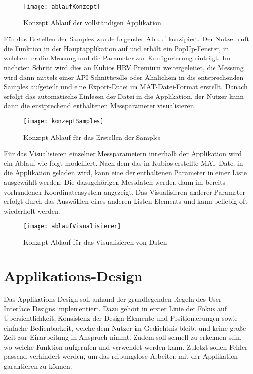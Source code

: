 \begin{figure}[H]
	\centering
	\texttt{[image: ablaufKonzept]}
	\caption{Konzept Ablauf der vollständigen Applikation}
	\label{fig:ablaufKonzept}
\end{figure}

Für das Erstellen der Samples wurde folgender Ablauf konzipiert. Der Nutzer ruft die Funktion in der Hauptapplikation auf und erhält ein PopUp-Fenster, in welchem er die Messung und die Parameter zur Konfigurierung einträgt. Im nächsten Schritt wird dies an Kubios HRV Premium weitergeleitet, die Messung  wird dann mittels einer API Schnittstelle oder Ähnlichem in die entsprechenden Samples aufgeteilt und eine Export-Datei im MAT-Datei-Format erstellt. Danach erfolgt das automatische Einlesen der Datei in die Applikation, der Nutzer kann dann die enstprechend enthaltenen Messparameter visualisieren.

\begin{figure}[H]
	\centering
	\texttt{[image: konzeptSamples]}
	\caption{Konzept Ablauf für das Erstellen der Samples}
	\label{fig:konzeptSamples}
\end{figure}

Für das Visualisieren einzelner Messparametern innerhalb der Applikation wird ein Ablauf wie folgt modelliert. Nach dem das in Kubios erstellte MAT-Datei in die Applikation geladen wird, kann eine der enthaltenen Parameter in einer Liste ausgewählt werden. Die dazugehörigen Messdaten werden dann im bereits vorhandenen Koordinatensystem angezeigt. Das Visualisieren anderer Parameter erfolgt durch das Auswählen eines anderen Listen-Elements und kann beliebig oft wiederholt werden. 

\begin{figure}[H]
	\centering
	\texttt{[image: ablaufVisualisieren]}
	\caption{Konzept Ablauf für das Visualisieren von Daten}
	\label{fig:ablaufVisualisieren}
\end{figure}

\section{Applikations-Design}

Das Applikations-Design soll anhand der grundlegenden Regeln des User Interface Designs implementiert. Dazu gehört in erster Linie der Fokus auf Übersichtlichkeit, Konsistenz der Design-Elemente und Positionierungen sowie einfache Bedienbarkeit, welche dem Nutzer im Gedächtnis bleibt und keine große Zeit zur Einarbeitung in Anspruch nimmt. Zudem soll schnell zu erkennen sein, wo welche Funktion aufgerufen und verwendet werden kann. Zuletzt sollen Fehler passend verhindert werden, um das reibungslose Arbeiten mit der Applikation garantieren zu können.

